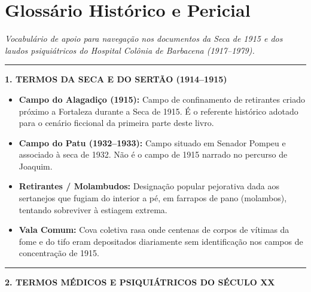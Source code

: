 \cleardoublepage
\thispagestyle{empty}
\chapter*{Glossário Histórico e Pericial}

\begingroup

\noindent\textit{Vocabulário de apoio para navegação nos documentos da Seca de 1915 e dos laudos psiquiátricos do Hospital Colônia de Barbacena (1917--1979).}

\vspace{0.8em}
\noindent\rule{\textwidth}{0.8pt}
\vspace{0.6em}

\noindent\textbf{1. TERMOS DA SECA E DO SERTÃO (1914--1915)}

\vspace{0.4em}
\begin{itemize}[itemsep=0.2em]
  \item \textbf{Campo do Alagadiço (1915):} Campo de confinamento de retirantes criado próximo a Fortaleza durante a Seca de 1915. É o referente histórico adotado para o cenário ficcional da primeira parte deste livro.
  \item \textbf{Campo do Patu (1932--1933):} Campo situado em Senador Pompeu e associado à seca de 1932. Não é o campo de 1915 narrado no percurso de Joaquim.
  \item \textbf{Retirantes / Molambudos:} Designação popular pejorativa dada aos sertanejos que fugiam do interior a pé, em farrapos de pano (molambos), tentando sobreviver à estiagem extrema.
  \item \textbf{Vala Comum:} Cova coletiva rasa onde centenas de corpos de vítimas da fome e do tifo eram depositados diariamente sem identificação nos campos de concentração de 1915.
\end{itemize}

\vspace{0.8em}
\noindent\rule{\textwidth}{0.5pt}
\vspace{0.6em}

\noindent\textbf{2. TERMOS MÉDICOS E PSIQUIÁTRICOS DO SÉCULO XX}

